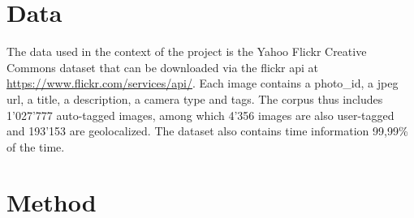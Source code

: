 \documentclass[sigconf]{acmart}
\begin{document}
\section{Data}
The data used in the context of the project is the Yahoo Flickr Creative Commons dataset that can be downloaded via the flickr api at \url{https://www.flickr.com/services/api/}. Each image contains a photo\_id, a jpeg url, a title, a description, a camera type and tags. The corpus thus includes 1'027'777 auto-tagged images, among which 4'356  images are also user-tagged and 193'153 are geolocalized. The dataset also contains time information 99,99\% of the time.






\section{Method}
\end{document}
